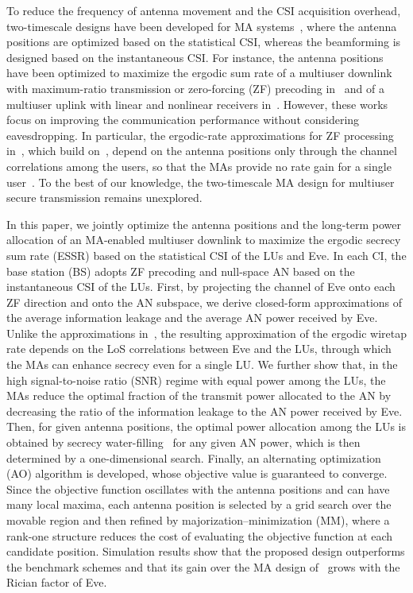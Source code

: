 \documentclass[journal]{IEEEtran}
\newcommand{\rev}[1]{{\color{red}#1}}
\newcommand{\rev}[1]{#1}
\begin{document}
To reduce the frequency of antenna movement and the CSI acquisition overhead, two-timescale designs have been developed for MA systems~\cite{ZhengTCOM2025,HuTVT2025,ZhuArxiv2024NF,YanArxiv2025}, where the antenna positions are optimized based on the statistical CSI, whereas the beamforming is designed based on the instantaneous CSI. For instance, the antenna positions have been optimized to maximize the ergodic sum rate of a multiuser downlink with maximum-ratio transmission or zero-forcing (ZF) precoding in~\cite{ZhengTCOM2025} and of a multiuser uplink with linear and nonlinear receivers in~\cite{HuTVT2025}. However, these works focus on improving the communication performance without considering eavesdropping. In particular, the ergodic-rate approximations for ZF processing in~\cite{ZhengTCOM2025,HuTVT2025}, which build on~\cite{ZhangJSTSP2014}, depend on the antenna positions only through the channel correlations among the users, so that the MAs provide no rate gain for a single user~\cite[Remark~2]{ZhengTCOM2025}. To the best of our knowledge, the two-timescale MA design for multiuser secure transmission remains unexplored.

In this paper, we jointly optimize the antenna positions and the long-term power allocation of an MA-enabled multiuser downlink to maximize the ergodic secrecy sum rate (ESSR) based on the statistical CSI of the LUs and Eve. In each CI, the base station (BS) adopts ZF precoding and null-space AN based on the instantaneous CSI of the LUs. First, by \rev{projecting the channel of Eve onto each ZF direction and onto} the AN subspace, we derive closed-form approximations of the average information leakage and the average AN power received by Eve. Unlike the approximations in~\cite{ZhengTCOM2025,HuTVT2025}, the resulting approximation of the ergodic wiretap rate depends on the LoS correlations between Eve and the LUs, through which the MAs can enhance secrecy even for a single LU. We further show that, in the high signal-to-noise ratio (SNR) regime \rev{with equal power among the LUs}, the MAs reduce the optimal fraction of the transmit power allocated to the AN by decreasing the ratio of the information leakage to the AN power received by Eve. Then, for given antenna positions, the optimal power allocation among the LUs is obtained by secrecy water-filling~\cite{Gopala2008,Liang2008} for any given AN power, which is then determined by a one-dimensional search. Finally, an alternating optimization (AO) algorithm is developed, whose objective value is guaranteed to converge. Since the objective function oscillates with the antenna positions \rev{and can have many local maxima}, each antenna position is selected by a grid search over the movable region and then refined by majorization--minimization (MM), where a rank-one structure reduces the cost of evaluating the objective function at each candidate position. Simulation results show that the proposed design outperforms the benchmark schemes and that its gain over the MA design of~\cite{ZhengTCOM2025} grows with the Rician factor of Eve.
\end{document}
